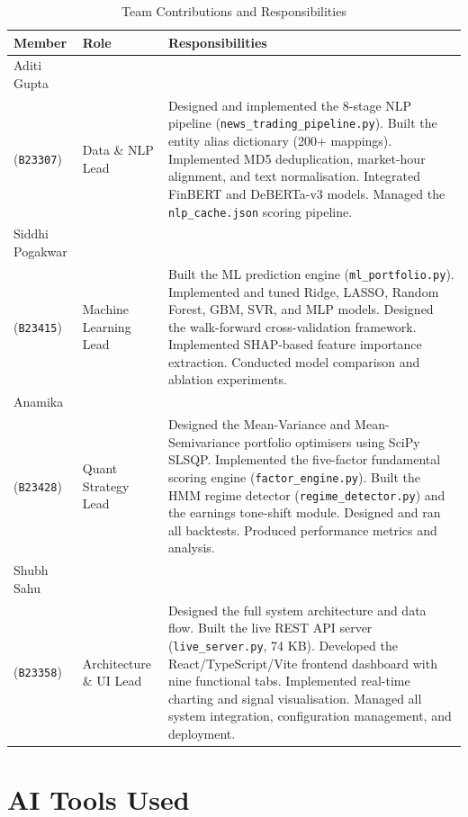\documentclass[12pt, a4paper]{article}
\begin{document}
\begin{table}[H]
\centering
\caption{Team Contributions and Responsibilities}
\renewcommand{\arraystretch}{1.5}
\begin{tabular}{@{}p{2.8cm} p{2.8cm} p{8cm}@{}}
\toprule
\textbf{Member} & \textbf{Role} & \textbf{Responsibilities} \\ \midrule
Aditi Gupta\\ (\texttt{B23307}) & Data \& NLP Lead &
Designed and implemented the 8-stage NLP pipeline (\texttt{news\_trading\_pipeline.py}). Built the entity alias dictionary (200+ mappings). Implemented MD5 deduplication, market-hour alignment, and text normalisation. Integrated FinBERT and DeBERTa-v3 models. Managed the \texttt{nlp\_cache.json} scoring pipeline. \\

Siddhi Pogakwar\\ (\texttt{B23415}) & Machine Learning Lead &
Built the ML prediction engine (\texttt{ml\_portfolio.py}). Implemented and tuned Ridge, LASSO, Random Forest, GBM, SVR, and MLP models. Designed the walk-forward cross-validation framework. Implemented SHAP-based feature importance extraction. Conducted model comparison and ablation experiments. \\

Anamika\\ (\texttt{B23428}) & Quant Strategy Lead &
Designed the Mean-Variance and Mean-Semivariance portfolio optimisers using SciPy SLSQP. Implemented the five-factor fundamental scoring engine (\texttt{factor\_engine.py}). Built the HMM regime detector (\texttt{regime\_detector.py}) and the earnings tone-shift module. Designed and ran all backtests. Produced performance metrics and analysis. \\

Shubh Sahu\\ (\texttt{B23358}) & Architecture \& UI Lead &
Designed the full system architecture and data flow. Built the live REST API server (\texttt{live\_server.py}, 74 KB). Developed the React/TypeScript/Vite frontend dashboard with nine functional tabs. Implemented real-time charting and signal visualisation. Managed all system integration, configuration management, and deployment. \\
\bottomrule
\end{tabular}
\end{table}

\section{AI Tools Used}
\end{document}
